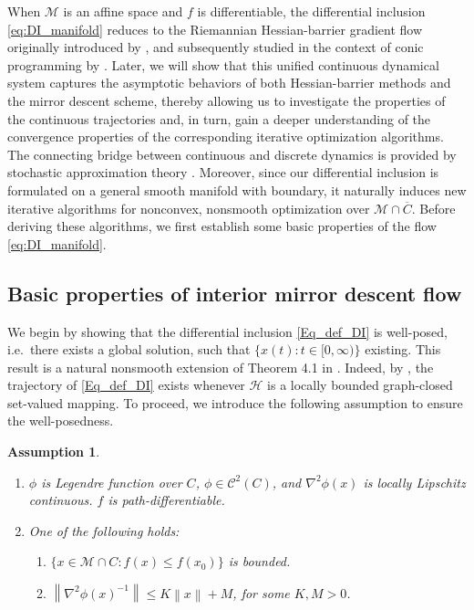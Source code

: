 \documentclass[11pt]{article}
\newcommand{\cC}{\mathcal C}
\newcommand{\cH}{\mathcal H}
\newcommand{\cM}{\mathcal M}
\def\norm#1{\left\|#1\right\|}
\newtheorem{assumption}{Assumption}[section]
\begin{document}
When \(\cM\) is an affine space and \(f\) is differentiable, the differential inclusion \eqref{eq:DI_manifold} reduces to the Riemannian Hessian-barrier gradient flow originally introduced by  \cite{alvarez2004hessian}, and subsequently studied in the context of conic programming by  \cite{bomze2019hessian,dvurechensky2025hessian}.  Later, we will show that this unified continuous dynamical system captures the asymptotic behaviors of both Hessian-barrier methods and the mirror descent scheme, thereby allowing us to investigate the properties of the continuous trajectories and, in turn, gain a deeper understanding of the convergence properties of the corresponding iterative optimization algorithms.  The connecting bridge between continuous and discrete dynamics is provided by stochastic approximation theory \cite{benaim2005stochastic,borkar2009stochastic}.  Moreover, since our differential inclusion is formulated on a general smooth manifold with boundary, it naturally induces new iterative algorithms for nonconvex, nonsmooth optimization over \(\cM\cap\overline C\).  Before deriving these algorithms, we first establish some basic properties of the flow \eqref{eq:DI_manifold}.



\subsection{Basic properties of interior mirror descent flow}
We begin by showing that the differential inclusion \eqref{Eq_def_DI} is well-posed, i.e.\ there exists a global solution, such that $\{x(t):t\in[0,\infty)\}$ existing.
This result is a natural nonsmooth extension of Theorem 4.1 in \cite{alvarez2004hessian}. Indeed, by \cite{aubin2012differential}, the trajectory of \eqref{Eq_def_DI} exists whenever $\cH$ is a locally bounded graph-closed set-valued mapping. To proceed, we introduce the following assumption to ensure the well-posedness. 
\begin{assumption}
\label{assumption:well_posed}
    \begin{enumerate}
        \item $\phi$ is Legendre function over $C$, $\phi\in\cC^2(C)$, and $\nabla^2\phi(x)$ is locally Lipschitz continuous. $f$ is path-differentiable.
        \item One of the following holds:
        \begin{enumerate}
            \item $\{x\in\cM\cap C:f(x)\leq f(x_0)\}$ is bounded.
            \item $\norm{\nabla^2\phi(x)^{-1}}\leq K\norm{x}+M$, for some $K,M>0$.
        \end{enumerate}
    \end{enumerate}
\end{assumption}
\end{document}
